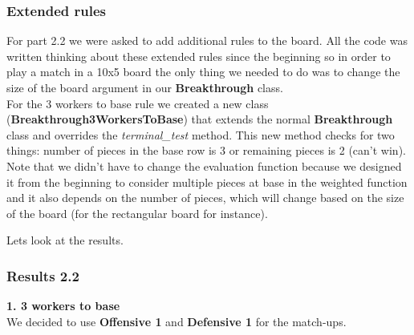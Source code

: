 \documentclass[11pt]{article}
\begin{document}
\subsubsection*{Extended rules}
For part 2.2 we were asked to add additional rules to the board. All the code was written thinking about these extended rules since the beginning so in order to play a match in a 10x5 board the only thing we needed to do was to change the size of the board argument in our \textbf{Breakthrough} class.\\
For the 3 workers to base rule we created a new class (\textbf{Breakthrough3WorkersToBase}) that extends the normal \textbf{Breakthrough} class and overrides the \textit{terminal\_test} method. This new method checks for two things: number of pieces in the base row is 3 or remaining pieces is 2 (can't win).\\
Note that we didn't have to change the evaluation function because we designed it from the beginning to consider multiple pieces at base in the weighted function and it also depends on the number of pieces, which will change based on the size of the board (for the rectangular board for instance).

Lets look at the results.\\

\subsubsection*{Results 2.2}

\textbf{1. 3 workers to base}\\
We decided to use \textbf{Offensive 1} and \textbf{Defensive 1} for the match-ups.\\
\end{document}
